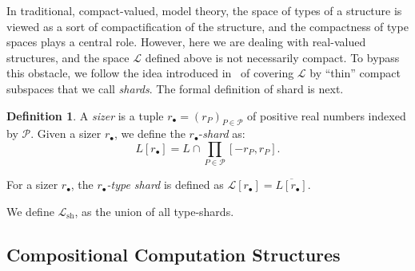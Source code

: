 \documentclass[psamsfonts]{amsart}
\theoremstyle{definition}
\newtheorem{defn}[thm]{Definition}
\theoremstyle{remark}
\newtheorem{rem}[thm]{Remark}
\numberwithin{equation}{section}
\begin{document}
In  traditional, compact-valued, model theory, the space of types of a structure is viewed as a sort of compactification of the structure, and the compactness of type spaces plays a central role.
However, here we are dealing with real-valued structures, and the space  $\mathcal{L}$ defined above is not necessarily compact.
To bypass this obstacle, we follow the idea introduced in~\cite{alva2024approximability} of covering $\mathcal{L}$ by ``thin'' compact subspaces that we call \emph{shards}.
The formal definition of shard is next.

\begin{defn}
A \emph{sizer} is a tuple $r_{\bullet}=(r_P)_{P\in\mathcal{P}}$ of positive real numbers indexed by $\mathcal{P}$.
Given a sizer $r_\bullet$, we define the $r_\bullet$-\emph{shard} as:
\[
L[r_\bullet]=L\cap\prod_{P\in\mathcal{P}}[-r_P,r_P].
\]

For a sizer  $r_{\bullet}$, the \emph{$r_{\bullet}$-type shard} is defined as $\mathcal{L}[r_\bullet]=\overline{L[r_\bullet]}$.

We define $\mathcal{L}_{\text{sh}}$, as the union of all type-shards.

\end{defn}


\subsection{Compositional Computation Structures} 
\end{document}

